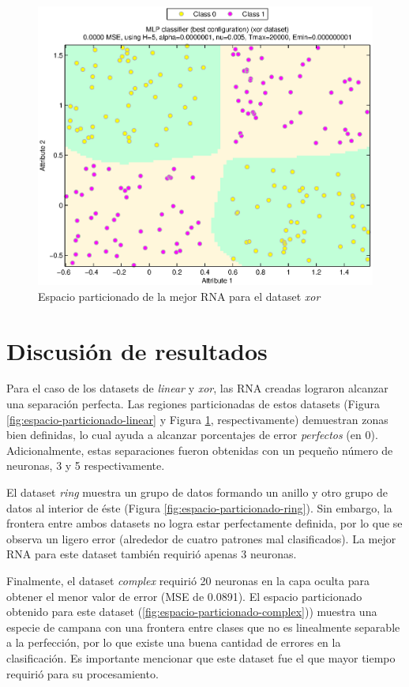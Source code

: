 \documentclass[journal]{IEEEtran}
\begin{document}
\begin{figure}[tb]
	\centering
	\includegraphics[width=\columnwidth]{imagenes/xor}
	\caption{Espacio particionado de la mejor RNA para el dataset \emph{xor}}
	\label{fig:espacio-particionado-xor}
\end{figure}


\section{Discusión de resultados}
\label{sec:discusion}
Para el caso de los datasets de \emph{linear} y \emph{xor}, las RNA creadas lograron alcanzar una separación perfecta.
Las regiones particionadas de estos datasets (Figura \ref{fig:espacio-particionado-linear} y Figura \ref{fig:espacio-particionado-xor}, respectivamente) demuestran zonas bien definidas, lo cual ayuda a alcanzar porcentajes de error \emph{perfectos} (en $0$).
Adicionalmente, estas separaciones fueron obtenidas con un pequeño número de neuronas, 3 y 5 respectivamente.

El dataset \emph{ring} muestra un grupo de datos formando un anillo y otro grupo de datos al interior de éste (Figura \ref{fig:espacio-particionado-ring}).
Sin embargo, la frontera entre ambos datasets no logra estar perfectamente definida, por lo que se observa un ligero error (alrededor de cuatro patrones mal clasificados).
La mejor RNA para este dataset también requirió apenas 3 neuronas.


Finalmente, el dataset \emph{complex} requirió 20 neuronas en la capa oculta para obtener el menor valor de error (MSE de 0.0891).
El espacio particionado obtenido para este dataset (\ref{fig:espacio-particionado-complex})) muestra una especie de campana con una frontera entre clases que no es linealmente separable a la perfección, por lo que existe una buena cantidad de errores en la clasificación.
Es importante mencionar que este dataset fue el que mayor tiempo requirió para su procesamiento.
\end{document}
